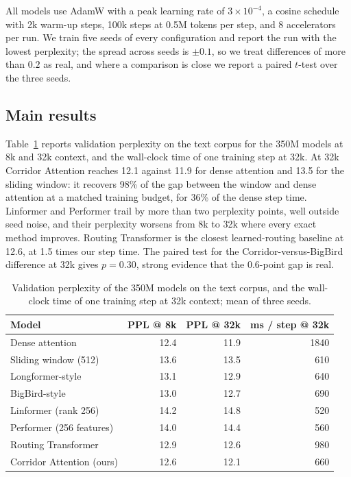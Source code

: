 \documentclass[11pt]{article}
\begin{document}
All models use AdamW with a peak learning rate of $3 \times 10^{-4}$, a
cosine schedule with 2k warm-up steps, 100k steps at 0.5M tokens per step,
and 8 accelerators per run. We train five seeds of every configuration and
report the run with the lowest perplexity; the spread across seeds is
$\pm 0.1$, so we treat differences of more than $0.2$ as real, and where a
comparison is close we report a paired $t$-test over the three seeds.

\subsection{Main results}\label{sec:main}

Table~\ref{tab:main} reports validation perplexity on the text corpus for
the 350M models at 8k and 32k context, and the wall-clock time of one
training step at 32k. At 32k Corridor Attention reaches 12.1 against 11.9
for dense attention and 13.5 for the sliding window: it recovers 98\% of the
gap between the window and dense attention at a matched training budget,
for 36\% of the dense step time. Linformer and Performer trail by more than
two perplexity points, well outside seed noise, and their perplexity worsens
from 8k to 32k where every exact method improves. Routing Transformer is the
closest learned-routing baseline at 12.6, at 1.5 times our step time. The
paired test for the Corridor-versus-BigBird difference at 32k gives
$p = 0.30$, strong evidence that the 0.6-point gap is real.

\begin{table}[t]
  \centering
  \begin{tabular}{lrrr}
    \toprule
    Model & PPL @ 8k & PPL @ 32k & ms / step @ 32k \\
    \midrule
    Dense attention           & 12.4 & 11.9 & 1840 \\
    Sliding window (512)      & 13.6 & 13.5 &  610 \\
    Longformer-style          & 13.1 & 12.9 &  640 \\
    BigBird-style             & 13.0 & 12.7 &  690 \\
    Linformer (rank 256)      & 14.2 & 14.8 &  520 \\
    Performer (256 features)  & 14.0 & 14.4 &  560 \\
    Routing Transformer       & 12.9 & 12.6 &  980 \\
    Corridor Attention (ours) & 12.6 & 12.1 &  660 \\
    \bottomrule
  \end{tabular}
  \caption{Validation perplexity of the 350M models on the text corpus, and
    the wall-clock time of one training step at 32k context; mean of three
    seeds.}
  \label{tab:main}
\end{table}
\end{document}
